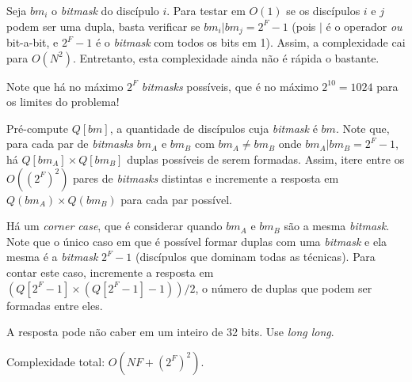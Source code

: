 Seja $bm_i$ o \textit{bitmask} do discípulo $i$. Para testar em $O(1)$ se os discípulos
$i$ e $j$ podem ser uma dupla, basta verificar se $bm_i | bm_j = 2^F-1$ (pois
        $|$ é o operador \textit{ou} bit-a-bit, e
        $2^F-1$ é o \textit{bitmask} com todos os bits em 1). Assim, a
complexidade cai para $O(N^2)$. Entretanto, esta complexidade ainda não é rápida
o bastante.

Note que há no máximo $2^F$ \textit{bitmasks} possíveis, que é no máximo $2^{10} =
1024$ para os limites do problema!

Pré-compute $Q[bm]$, a quantidade de discípulos cuja \textit{bitmask} é $bm$.
Note que, para cada par de \textit{bitmasks} $bm_A$ e $bm_B$ com $bm_A \neq
bm_B$ onde $bm_A | bm_B = 2^F - 1$,
há $Q[bm_A] \times Q[bm_B]$ duplas possíveis de serem formadas.
Assim, itere entre os $O((2^F)^2)$ pares de \textit{bitmasks} distintas
e incremente a resposta em $Q(bm_A) \times Q(bm_B)$ para cada par possível.

Há um \textit{corner case}, que é considerar quando $bm_A$ e $bm_B$ são a mesma
\textit{bitmask}. Note que o único caso em que é possível formar duplas com uma
\textit{bitmask} e ela mesma é a \textit{bitmask} $2^F-1$ (discípulos que
        dominam todas as técnicas). Para contar este caso, incremente a resposta
em $(Q[2^F-1] \times (Q[2^F-1] - 1))/2$, o número de duplas que podem ser formadas
entre eles.

A resposta pode não caber em um inteiro de 32 bits. Use \textit{long long}.

Complexidade total: $O(NF + (2^F)^2)$.

